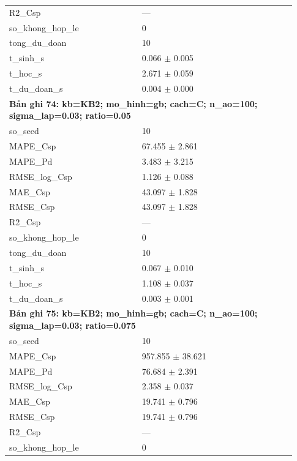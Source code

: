 \begin{longtable}{p{0.43\linewidth}p{0.50\linewidth}}
R2\_\allowbreak Csp & — \\
so\_\allowbreak khong\_\allowbreak hop\_\allowbreak le & 0 \\
tong\_\allowbreak du\_\allowbreak doan & 10 \\
t\_\allowbreak sinh\_\allowbreak s & 0.066 $\pm$ 0.005 \\
t\_\allowbreak hoc\_\allowbreak s & 2.671 $\pm$ 0.059 \\
t\_\allowbreak du\_\allowbreak doan\_\allowbreak s & 0.004 $\pm$ 0.000 \\
\midrule
\multicolumn{2}{p{0.95\linewidth}}{\textbf{Bản ghi 74: kb=KB2; mo\_hinh=gb; cach=C; n\_ao=100; sigma\_lap=0.03; ratio=0.05}} \\
so\_\allowbreak seed & 10 \\
MAPE\_\allowbreak Csp & 67.455 $\pm$ 2.861 \\
MAPE\_\allowbreak Pd & 3.483 $\pm$ 3.215 \\
RMSE\_\allowbreak log\_\allowbreak Csp & 1.126 $\pm$ 0.088 \\
MAE\_\allowbreak Csp & 43.097 $\pm$ 1.828 \\
RMSE\_\allowbreak Csp & 43.097 $\pm$ 1.828 \\
R2\_\allowbreak Csp & — \\
so\_\allowbreak khong\_\allowbreak hop\_\allowbreak le & 0 \\
tong\_\allowbreak du\_\allowbreak doan & 10 \\
t\_\allowbreak sinh\_\allowbreak s & 0.067 $\pm$ 0.010 \\
t\_\allowbreak hoc\_\allowbreak s & 1.108 $\pm$ 0.037 \\
t\_\allowbreak du\_\allowbreak doan\_\allowbreak s & 0.003 $\pm$ 0.001 \\
\midrule
\multicolumn{2}{p{0.95\linewidth}}{\textbf{Bản ghi 75: kb=KB2; mo\_hinh=gb; cach=C; n\_ao=100; sigma\_lap=0.03; ratio=0.075}} \\
so\_\allowbreak seed & 10 \\
MAPE\_\allowbreak Csp & 957.855 $\pm$ 38.621 \\
MAPE\_\allowbreak Pd & 76.684 $\pm$ 2.391 \\
RMSE\_\allowbreak log\_\allowbreak Csp & 2.358 $\pm$ 0.037 \\
MAE\_\allowbreak Csp & 19.741 $\pm$ 0.796 \\
RMSE\_\allowbreak Csp & 19.741 $\pm$ 0.796 \\
R2\_\allowbreak Csp & — \\
so\_\allowbreak khong\_\allowbreak hop\_\allowbreak le & 0 \\

\end{longtable}
